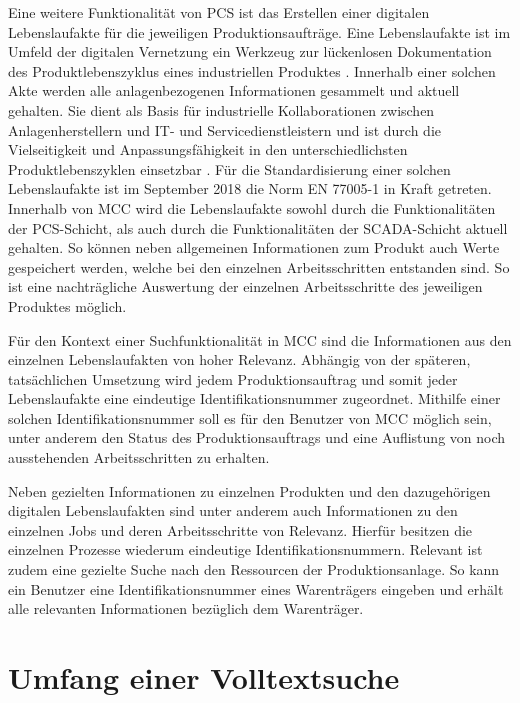 Eine weitere Funktionalität von PCS ist das Erstellen einer digitalen Lebenslaufakte für die jeweiligen Produktionsaufträge. Eine Lebenslaufakte ist im Umfeld der digitalen Vernetzung ein Werkzeug zur lückenlosen Dokumentation des Produktlebenszyklus eines industriellen Produktes \cite{MaximilianAusterjost.2021}. Innerhalb einer solchen Akte werden alle anlagenbezogenen Informationen gesammelt und aktuell gehalten. Sie dient als Basis für industrielle Kollaborationen zwischen Anlagenherstellern und IT- und Servicedienstleistern und ist durch die Vielseitigkeit und Anpassungsfähigkeit in den unterschiedlichsten Produktlebenszyklen einsetzbar \cite{MaximilianAusterjost.2021}. Für die Standardisierung einer solchen Lebenslaufakte ist im September 2018 die Norm \glqq EN 77005-1\grqq{} in Kraft getreten. Innerhalb von MCC wird die Lebenslaufakte sowohl durch die Funktionalitäten der PCS-Schicht, als auch durch die Funktionalitäten der SCADA-Schicht aktuell gehalten. So können neben allgemeinen Informationen zum Produkt auch Werte gespeichert werden, welche bei den einzelnen Arbeitsschritten entstanden sind. So ist eine nachträgliche Auswertung der einzelnen Arbeitsschritte des jeweiligen Produktes möglich.

Für den Kontext einer Suchfunktionalität in MCC sind die Informationen aus den einzelnen Lebenslaufakten von hoher Relevanz. Abhängig von der späteren, tatsächlichen Umsetzung wird jedem Produktionsauftrag und somit jeder Lebenslaufakte eine eindeutige Identifikationsnummer zugeordnet. Mithilfe einer solchen Identifikationsnummer soll es für den Benutzer von MCC möglich sein, unter anderem den Status des Produktionsauftrags und eine Auflistung von noch ausstehenden Arbeitsschritten zu erhalten.

Neben gezielten Informationen zu einzelnen Produkten und den dazugehörigen digitalen Lebenslaufakten sind unter anderem auch Informationen zu den einzelnen Jobs und deren Arbeitsschritte von Relevanz. Hierfür besitzen die einzelnen Prozesse wiederum eindeutige Identifikationsnummern. Relevant ist zudem eine gezielte Suche nach den Ressourcen der Produktionsanlage. So kann ein Benutzer eine Identifikationsnummer eines Warenträgers eingeben und erhält alle relevanten Informationen bezüglich dem Warenträger.

\section{Umfang einer Volltextsuche\label{sec3.2:Unterunterpunkt-2}}


